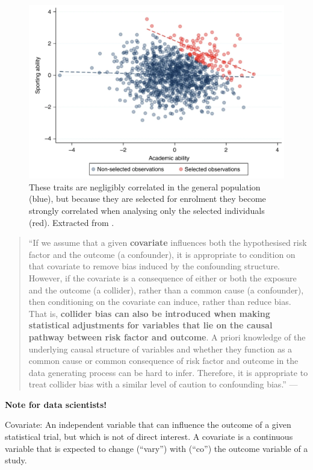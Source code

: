 \documentclass[
]{book}
\begin{document}
\begin{figure}

{\centering \includegraphics[width=0.75\linewidth]{Figures/fig_nature_academic_ability} 

}

\caption{These traits are negligibly correlated in the general population (blue), but because they are selected for enrolment they become strongly correlated when analysing only the selected individuals (red). Extracted from \citep{griffith2020collider}.}\label{fig:cibb-academic-corr}
\end{figure}

\begin{quote}
``If we assume that a given \textbf{covariate} influences both the hypothesised risk factor and the outcome (a confounder), it is appropriate to condition on that covariate to remove bias induced by the confounding structure. However, if the covariate is a consequence of either or both the exposure and the outcome (a collider), rather than a common cause (a confounder), then conditioning on the covariate can induce, rather than reduce bias. That is, \textbf{collider bias can also be introduced when making statistical adjustments for variables that lie on the causal pathway between risk factor and outcome}. A priori knowledge of the underlying causal structure of variables and whether they function as a common cause or common consequence of risk factor and outcome in the data generating process can be hard to infer. Therefore, it is appropriate to treat collider bias with a similar level of caution to confounding bias.'' --- \citep{griffith2020collider}
\end{quote}

\begin{tipbox}

\textbf{Note for data scientists!}

Covariate: An independent variable that can influence the outcome of a given statistical trial, but which is not of direct interest. A covariate is a continuous variable that is expected to change (``vary'') with (``co'') the outcome variable of a study.

\end{tipbox}
\end{document}

